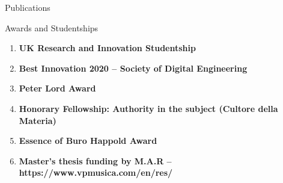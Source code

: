 \documentclass{resume}
\begin{document}
\begin{rSection}{Publications}
    
\end{rSection}

\clearpage
\begin{rSection}{Awards and Studentships}
\begin{enumerate}[leftmargin=0.45cm, itemsep=0em, topsep=0.5em, parsep=0.2em]
    \item
    \textbf{UK Research and Innovation Studentship}
    \item
    \textbf{Best Innovation 2020 – Society of Digital Engineering}
    \item
    \textbf{Peter Lord Award}
    \item
    \textbf{Honorary Fellowship: Authority in the subject (Cultore della Materia)}
    \item
    \textbf{Essence of Buro Happold Award}
    \item
    \textbf{Master’s thesis funding by M.A.R – https://www.vpmusica.com/en/res/}
\end{enumerate}
\end{rSection}
\end{document}
